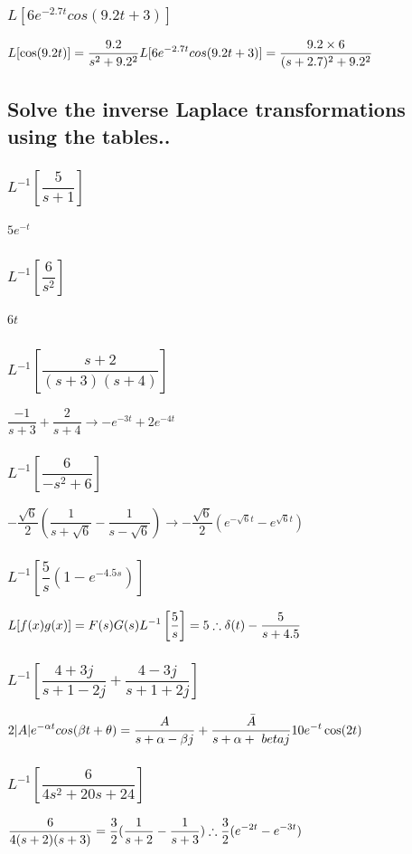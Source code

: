 \documentclass[12pt,a4paper]{article}
\begin{document}
\subsubsection{$L[6e^{-2.7t}cos(9.2t+3)]$}
$\displaystyle L[\cos (9.2t)] = \frac{9.2}{s^2+9.2^2}\\
L[6e^{-2.7t}cos(9.2t+3)]=\frac{9.2\times 6}{(s+2.7)^2+9.2^2}$
\subsection{Solve the inverse Laplace transformations using the tables..}
\subsubsection{$L^{-1}[\dfrac{5}{s+1}]$}
$5e^{-t}$
\subsubsection{$L^{-1}[\dfrac{6}{s^2}]$}
$6t$
\subsubsection{$L^{-1}[\dfrac{s+2}{(s+3)(s+4)}]$}
$\dfrac{-1}{s+3}+\dfrac{2}{s+4}\longrightarrow -e^{-3t}+2e^{-4t}$
\subsubsection{$L^{-1}[\dfrac{6}{-s^2+6}]$}
$-\dfrac{\sqrt{6}}{2}(\dfrac{1}{s+\sqrt{6}}-\dfrac{1}{s-\sqrt{6}})
\longrightarrow -\dfrac{\sqrt{6}}{2}(e^{-\sqrt{6}t} - e^{\sqrt{6}t})$
\subsubsection{$L^{-1}[\dfrac{5}{s}(1-e^{-4.5s})]$}
$\displaystyle L[f(x)g(x)] = F(s)G(s)\\
L^{-1}\left[\dfrac{5}{s} \right]= 5\\
\therefore \delta (t) - \frac{5}{s+4.5}$
\subsubsection{$L^{-1}[\dfrac{4+3j}{s+1-2j}+\dfrac{4-3j}{s+1+2j}]$}
$\displaystyle 2|A|e^{-\alpha t}cos(\beta t + \theta) = 
\frac{A}{s+\alpha - \beta j}+\frac{\bar{A}}{s+\alpha + \ beta j}\\
10e^{-t}\cos (2t)$
\subsubsection{$L^{-1}[\dfrac{6}{4s^2+20s+24}]$}
$\displaystyle \frac{6}{4(s+2)(s+3)}
=\frac{3}{2}(\frac{1}{s+2}-\frac{1}{s+3})\\
\therefore \frac{3}{2}(e^{-2t} - e^{-3t})$
\end{document}
